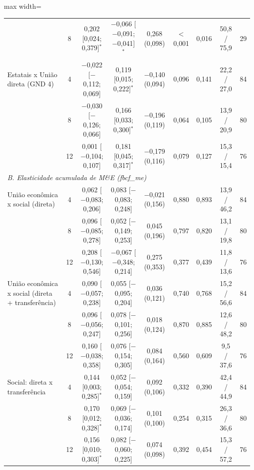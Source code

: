 \begin{table}[htbp]
\begin{adjustbox}{max width=\linewidth}
\begin{tabular}{p{3.4cm}cccccccc}
 & 8 & 0{,}202 [0{,}024; 0{,}379]$^{*}$ & $-$0{,}066 [$-$0{,}091; $-$0{,}041]$^{*}$ & 0{,}268 (0{,}098) & $<$0{,}001 & 0{,}016 & 50{,}8 / 75{,}9 & 29 \\
Estatais x Uni\~ao direta (GND 4) & 4 & $-$0{,}022 [$-$0{,}112; 0{,}069] & 0{,}119 [0{,}015; 0{,}222]$^{*}$ & $-$0{,}140 (0{,}094) & 0{,}096 & 0{,}141 & 22{,}2 / 27{,}0 & 84 \\
 & 8 & $-$0{,}030 [$-$0{,}126; 0{,}066] & 0{,}166 [0{,}033; 0{,}300]$^{*}$ & $-$0{,}196 (0{,}119) & 0{,}064 & 0{,}105 & 13{,}9 / 20{,}9 & 80 \\
 & 12 & 0{,}001 [$-$0{,}104; 0{,}107] & 0{,}181 [0{,}045; 0{,}317]$^{*}$ & $-$0{,}179 (0{,}116) & 0{,}079 & 0{,}127 & 15{,}3 / 15{,}4 & 76 \\
\multicolumn{9}{l}{\textit{B. Elasticidade acumulada de M\&E (fbcf\_me)}} \\
Uni\~ao econ\^omica x social (direta) & 4 & 0{,}062 [$-$0{,}083; 0{,}206] & 0{,}083 [$-$0{,}083; 0{,}248] & $-$0{,}021 (0{,}156) & 0{,}880 & 0{,}893 & 13{,}9 / 46{,}2 & 84 \\
 & 8 & 0{,}096 [$-$0{,}085; 0{,}278] & 0{,}052 [$-$0{,}149; 0{,}253] & 0{,}045 (0{,}196) & 0{,}797 & 0{,}820 & 13{,}1 / 19{,}8 & 80 \\
 & 12 & 0{,}208 [$-$0{,}130; 0{,}546] & $-$0{,}067 [$-$0{,}348; 0{,}214] & 0{,}275 (0{,}353) & 0{,}377 & 0{,}439 & 11{,}8 / 13{,}6 & 76 \\
Uni\~ao econ\^omica x social (direta + transfer\^encia) & 4 & 0{,}090 [$-$0{,}057; 0{,}238] & 0{,}055 [$-$0{,}095; 0{,}204] & 0{,}036 (0{,}121) & 0{,}740 & 0{,}768 & 15{,}2 / 56{,}6 & 84 \\
 & 8 & 0{,}096 [$-$0{,}056; 0{,}247] & 0{,}078 [$-$0{,}101; 0{,}256] & 0{,}018 (0{,}124) & 0{,}870 & 0{,}885 & 12{,}6 / 48{,}2 & 80 \\
 & 12 & 0{,}160 [$-$0{,}038; 0{,}358] & 0{,}076 [$-$0{,}154; 0{,}305] & 0{,}084 (0{,}164) & 0{,}560 & 0{,}609 & 9{,}5 / 37{,}6 & 76 \\
Social: direta x transfer\^encia & 4 & 0{,}144 [0{,}003; 0{,}285]$^{*}$ & 0{,}052 [$-$0{,}054; 0{,}159] & 0{,}092 (0{,}106) & 0{,}332 & 0{,}390 & 42{,}4 / 44{,}9 & 84 \\
 & 8 & 0{,}170 [0{,}012; 0{,}328]$^{*}$ & 0{,}069 [$-$0{,}036; 0{,}174] & 0{,}101 (0{,}100) & 0{,}254 & 0{,}315 & 26{,}3 / 36{,}6 & 80 \\
 & 12 & 0{,}156 [0{,}010; 0{,}303]$^{*}$ & 0{,}082 [$-$0{,}060; 0{,}225] & 0{,}074 (0{,}098) & 0{,}392 & 0{,}454 & 15{,}3 / 57{,}2 & 76 \\

\end{tabular}
\end{adjustbox}
\end{table}
